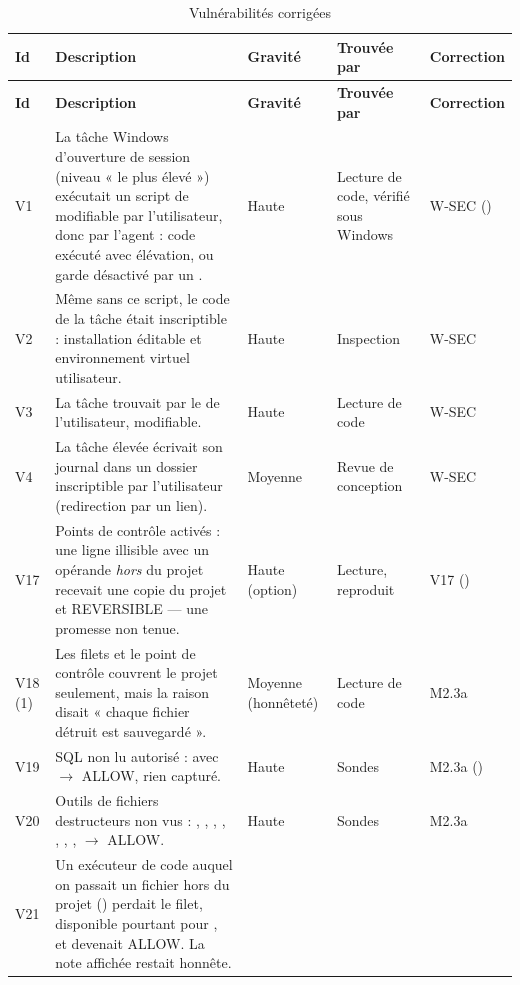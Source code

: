 {\small
\begin{longtable}{@{}L{1.5cm}L{6.0cm}L{1.6cm}L{1.9cm}L{3.3cm}@{}}
\caption{Vulnérabilités corrigées}\label{tab:v-corrigees}\\
\toprule
\textbf{Id} & \textbf{Description} & \textbf{Gravité} & \textbf{Trouvée par} & \textbf{Correction} \\
\midrule
\endfirsthead
\toprule
\textbf{Id} & \textbf{Description} & \textbf{Gravité} & \textbf{Trouvée par} & \textbf{Correction} \\
\midrule
\endhead
\bottomrule
\endfoot
V1 & La tâche Windows d'ouverture de session (niveau « le plus élevé ») exécutait un script de
   modifiable par l'utilisateur, donc par l'agent : code exécuté avec
  élévation, ou garde désactivé par un . & Haute & Lecture de code, vérifié
  sous Windows & W-SEC () \\
V2 & Même sans ce script, le code de la tâche était inscriptible : installation éditable et
  environnement virtuel utilisateur. & Haute & Inspection & W-SEC \\
V3 & La tâche trouvait  par le  de l'utilisateur, modifiable. & Haute &
  Lecture de code & W-SEC \\
V4 & La tâche élevée écrivait son journal dans un dossier inscriptible par l'utilisateur
  (redirection par un lien). & Moyenne & Revue de conception & W-SEC \\
V17 & Points de contrôle activés : une ligne illisible avec un opérande \emph{hors} du projet
  recevait une copie du projet et REVERSIBLE --- une promesse non tenue. & Haute (option) &
  Lecture, reproduit & V17 () \\
V18 (1) & Les filets et le point de contrôle couvrent le projet seulement, mais la raison disait
  « chaque fichier détruit est sauvegardé ». & Moyenne (honnêteté) & Lecture de code & M2.3a \\
V19 & SQL non lu autorisé :  avec  $\rightarrow$
  ALLOW, rien capturé. & Haute & Sondes & M2.3a () \\
V20 & Outils de fichiers destructeurs non vus : , , ,
  , , , , 
  $\rightarrow$ ALLOW. & Haute & Sondes & M2.3a \\
V21 & Un exécuteur de code auquel on passait un fichier hors du projet () perdait le filet, disponible pourtant pour , et devenait ALLOW. La note affichée restait honnête. &

\end{longtable}}
